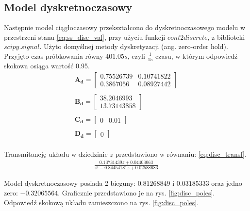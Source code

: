 \documentclass{article}
\begin{document}
\subsection{Model dyskretnoczasowy}
Następnie model ciągłoczasowy przekształcono do dyskretnoczasowego modelu w przestrzeni stanu \ref{eq:ss_disc_val}, przy użyciu funkcji $cont2discrete$, z biblioteki $scipy.signal$. Użyto domyślnej metody dyskretyzacji (ang. zero-order hold). Przyjęto czas próbkowania równy $401.05s$, czyli $\frac{1}{15}$ czasu, w którym odpowiedź skokowa osiąga wartość 0.95.
\begin{equation}\label{eq:ss_disc_val}
 \begin{array}{l}
  \mathbf{A_d} = \begin{bmatrix}  0.75526739 & 0.10741822 \\
  							     0.3867056  & 0.08927442 
  			   \end{bmatrix} \\ \\
  \mathbf{B_d} = \begin{bmatrix} 38.2046993 \\ 13.73143858 \end{bmatrix} \\ \\
  \mathbf{C_d} = \begin{bmatrix} 0 & 0.01 \end{bmatrix} \\ \\
  \mathbf{D_d} = \begin{bmatrix} 0 \end{bmatrix} \\
\end{array}
\end{equation}

Transmitancję układu w dziedzinie $z$ przedstawiono w równaniu: \ref{eq:disc_transf}.
\begin{equation}\label{eq:disc_transf}
 \begin{array}{l}
  \frac{0.13731439 z + 0.04403063}{ z^2 - 0.84454181 z + 0.02588683}
\end{array}
\end{equation}

Model dyskretnoczasowy posiada 2 bieguny: $0.81268849$ i $0.03185333$ oraz jedno zero: $-0.32065564$. Graficznie przedstawiono je na rys. \ref{fig:disc_poles}. Odpowiedź skokową układu zamieszczono na rys. \ref{fig:disc_poles}.
\end{document}
